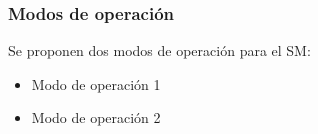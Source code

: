 \subsubsection{Modos de operación}
Se proponen dos modos de operación para el SM:
\begin{itemize}
    \item Modo de operación 1
    \item Modo de operación 2
\end{itemize}